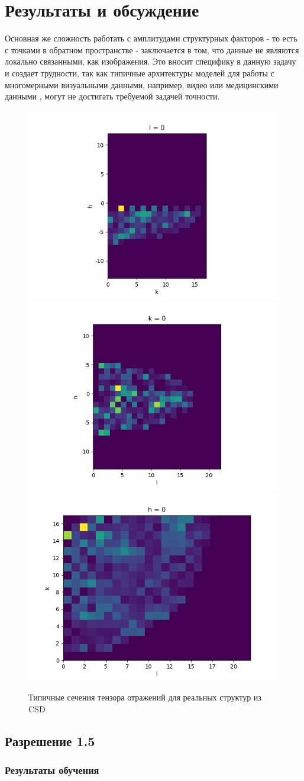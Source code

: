 \section{Результаты и обсуждение}

Основная же сложность работать с амплитудами структурных факторов - то есть с точками в обратном пространстве - заключается в том, что данные не являются локально связанными, как изображения. Это вносит специфику в данную задачу и создает трудности, так как типичные архитектуры моделей для работы с многомерными визуальными данными, например, видео или медицинскими данными \cite{forigua_superformer_2022}, могут не достигать требуемой задачей точности.

\begin{figure}[ht!]
            \includegraphics[width=.3\textwidth]{figures/hk_plane_l_0.png}\hfill
            \includegraphics[width=.3\textwidth]{figures/hl_plane_k_0.png}\hfill
            \includegraphics[width=.3\textwidth]{figures/kl_plane_h_0.png}
            \caption{Типичные сечения тензора отражений для реальных структур из CSD}
            \label{locally}
\end{figure}


\subsection{Разрешение 1.5\angstrom}

\subsubsection{Результаты обучения}

